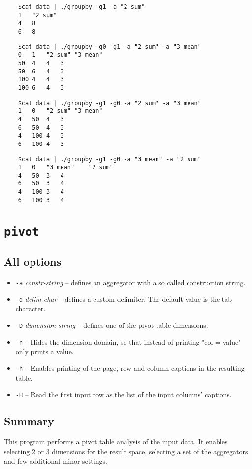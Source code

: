 \documentclass{report}
\begin{document}
	\begin{verbatim}
	$cat data | ./groupby -g1 -a "2 sum"
	1	"2 sum"
	4	8
	6	8
	\end{verbatim}

	\begin{verbatim}
	$cat data | ./groupby -g0 -g1 -a "2 sum" -a "3 mean"
	0	1	"2 sum"	"3 mean"
	50	4	4	3
	50	6	4	3
	100	4	4	3
	100	6	4	3
	\end{verbatim}

	\begin{verbatim}
	$cat data | ./groupby -g1 -g0 -a "2 sum" -a "3 mean"
	1	0	"2 sum"	"3 mean"
	4	50	4	3
	6	50	4	3
	4	100	4	3
	6	100	4	3
	\end{verbatim}

	\begin{verbatim}
	$cat data | ./groupby -g1 -g0 -a "3 mean" -a "2 sum"
	1	0	"3 mean"	"2 sum"
	4	50	3	4
	6	50	3	4
	4	100	3	4
	6	100	3	4
	\end{verbatim}

\section{\texttt{pivot}}

	\subsection{All options}
	\begin{itemize}
		\item \texttt{-a} \textit{constr-string} -- defines an aggregator with a
			so called construction string.
		\item \texttt{-d} \textit{delim-char} -- defines a custom delimiter.
			The default value is the tab character.
		\item \texttt{-D} \textit{dimension-string} -- defines one of the pivot
			table dimensions.
		\item \texttt{-n} -- Hides the dimension domain, so that instead of printing
			"col = value" only prints a value.
		\item \texttt{-h} -- Enables printing of the page, row and column
			captions in the resulting table.
		\item \texttt{-H} -- Read the first input row as the list of the input
			columns' captions.
	\end{itemize}

	\subsection{Summary}
	This program performs a pivot table analysis of the input data. It enables
	selecting 2 or 3 dimensions for the result space, selecting a set of the
	aggregators and few additional minor settings.
\end{document}
